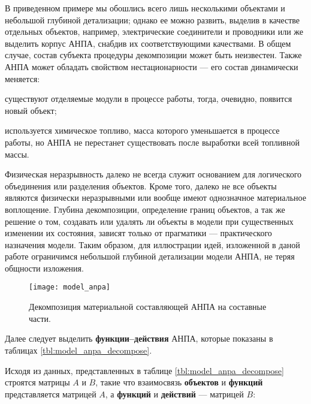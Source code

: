 В приведенном примере мы обошлись всего лишь несколькими объектами и небольшой глубиной детализации;
однако ее можно развить, выделив в качестве отдельных объектов, например, электрические соединители и проводники
или же выделить корпус АНПА, снабдив их соответствующими качествами.
В общем случае, состав субъекта процедуры декомпозиции может быть неизвестен.
Также АНПА может обладать свойством нестационарности --- его состав динамически меняется:
\begin{enumerate*}[label=\itshape\alph*\upshape)]
\item  существуют отделяемые модули в процессе работы, тогда, очевидно, появится новый объект;
\item используется химическое топливо, масса которого уменьшается в процессе работы,
   но АНПА не перестанет существовать после выработки всей топливной массы.
\end{enumerate*}
Физическая неразрывность далеко не всегда служит основанием для логического объединения или разделения объектов.
Кроме того, далеко не все объекты являются физически неразрывными или вообще имеют однозначное материальное воплощение.
%
Глубина декомпозиции, определение границ объектов, а так же решение о том, создавать или удалять ли объекты в модели
при существенных изменении их состояния, зависят только от прагматики --- практического назначения модели.
Таким образом, для иллюстрации идей, изложенной в даной работе ограничимся небольшой глубиной детализации модели АНПА,
не теряя общности изложения.

\begin{center}
    \begin{figure}[hb!]
        \texttt{[image: model\_anpa]}
        \caption[Декомпозиция материальной составляющей]
            {Декомпозиция материальной составляющей АНПА на составные части.}
                \label{fig:model_anpa}
    \end{figure}
\end{center}

Далее следует выделить \textbf{функции--действия} АНПА, которые показаны в таблицах
\ref{tbl:model_anpa_decompose}.



Исходя из данных, представленных в таблице \ref{tbl:model_anpa_decompose}
строятся матрицы $A$ и $B$, такие что
взаимосвязь \textbf{объектов} и \textbf{функций} представляется матрицей $A$,
а \textbf{функций} и \textbf{действий} --- матрицей $B$:

